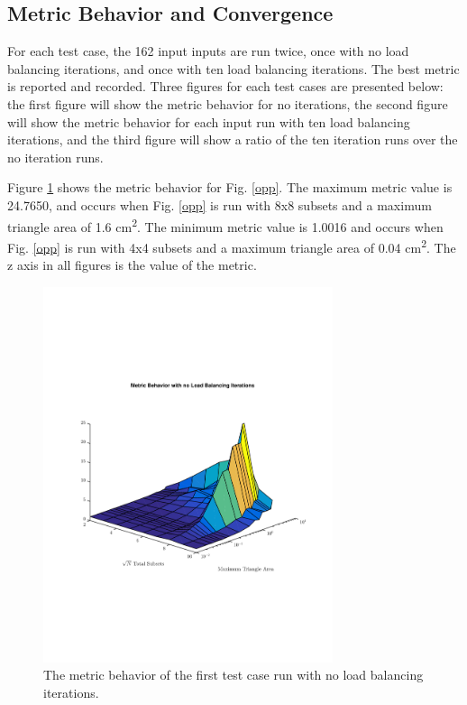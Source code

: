 \documentclass{anstrans}
\begin{document}
\subsection{Metric Behavior and Convergence}

For each test case, the 162 input inputs are run twice, once with no load balancing iterations, and once with ten load balancing iterations. The best metric is reported and recorded. Three figures for each test cases are presented below: the first figure will show the metric behavior for no iterations, the second figure will show the metric behavior for each input run with ten load balancing iterations, and the third figure will show a ratio of the ten iteration runs over the no iteration runs.

Figure \ref{oppnoiter} shows the metric behavior for Fig. \ref{opp}. The maximum metric value is 24.7650, and occurs when Fig. \ref{opp} is run with 8x8 subsets and a maximum triangle area of 1.6 cm\textsuperscript{2}. The minimum metric value is 1.0016 and occurs when Fig. \ref{opp} is run with 4x4 subsets and a maximum triangle area of 0.04 cm\textsuperscript{2}. The z axis in all figures is the value of the metric.

\begin{figure}
\centering
\includegraphics[width=85mm, trim = 0cm 5cm 0cm 5cm,clip]{figures/OppNoIter.pdf}
\caption{The metric behavior of the first test case run with no load balancing iterations.}
\label{oppnoiter}
\end{figure}
\end{document}

